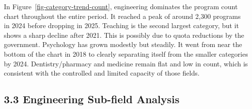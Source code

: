 \documentclass[
  11pt,
  a4paper,
  DIV=11,
  numbers=noendperiod]{scrartcl}
\begin{document}
In Figure~\ref{fig-category-trend-count}, engineering dominates the
program count chart throughout the entire period. It reached a peak of
around 2,300 programs in 2024 before dropping in 2025. Teaching is the
second largest category, but it shows a sharp decline after 2021. This
is possibly due to quota reductions by the government. Psychology has
grown modestly but steadily. It went from near the bottom of the chart
in 2018 to clearly separating itself from the smaller categories by
2024. Dentistry/pharmacy and medicine remain flat and low in count,
which is consistent with the controlled and limited capacity of those
fields.

\subsection{3.3 Engineering Sub-field
Analysis}\label{engineering-sub-field-analysis}
\end{document}
